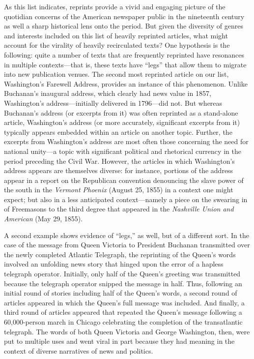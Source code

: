 \documentclass[pdftex,11pt]{article}
\begin{document}
As this list indicates, reprints provide a vivid and engaging picture
of the quotidian concerns of the American newspaper public in the
nineteenth century as well a sharp historical lens onto the period.
But given the diversity of genres and interests included on this list
of heavily reprinted articles, what might account for the virality of
heavily recirculated texts?  One hypothesis is the following: quite a
number of texts that are frequently reprinted have resonances in
multiple contexts---that is, these texts have ``legs'' that allow them
to migrate into new publication venues.  The second most reprinted
article on our list, Washington's Farewell Address, provides an
instance of this phenomenon.  Unlike Buchanan's inaugural address,
which clearly had news value in 1857, Washington's address---initially
delivered in 1796---did not.  But whereas Buchanan's address (or
excerpts from it) was often reprinted as a stand-alone article,
Washington's address (or more accurately, significant excerpts from
it) typically appears embedded within an article on another topic.
Further, the excerpts from Washington's address are most often those
concerning the need for national unity---a topic with significant
political and rhetorical currency in the period preceding the Civil
War.  However, the articles in which Washington's address appears are
themselves diverse: for instance, portions of the address appear in a
report on the Republican convention denouncing the slave power of the
south in the \textit{Vermont Phoenix} (August 25, 1855) in a context
one might expect; but also in a less anticipated context---namely a
piece on the swearing in of Freemasons to the third degree that
appeared in the \textit{Nashville Union and American} (May 29, 1855).

A second example shows evidence of ``legs,'' as well, but of a
different sort.  In the case of the message from Queen Victoria to
President Buchanan transmitted over the newly completed Atlantic
Telegraph, the reprinting of the Queen's words involved an unfolding
news story that hinged upon the error of a hapless telegraph operator.
Initially, only half of the Queen's greeting was transmitted because
the telegraph operator snipped the message in half.  Thus, following
an initial round of stories including half of the Queen's words, a
second round of articles appeared in which the Queen's full message
was included.  And finally, a third round of articles appeared that
repeated the Queen's message following a 60,000-person march in
Chicago celebrating the completion of the transatlantic telegraph.
The words of both Queen Victoria and George Washington, then, were put
to multiple uses and went viral in part because they had meaning in
the context of diverse narratives of news and politics.
\end{document}
